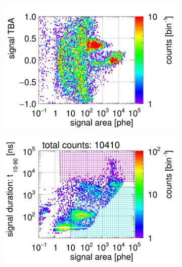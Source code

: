 \begin{landscape}
\begin{figure}[!p]
\begin{subfigure}[t]{0.32\textwidth}
			\includegraphics[width=\figurewidth,clip,trim={0 8 0 40}]{Figures/GasTest/CutsValid/res64765/tbapaX23Vecfig64765.jpg}
			\caption{}
			\label{fig:signal selection dv 08 02}
		\end{subfigure}
		\begin{subfigure}[t]{0.32\textwidth}
			\centering
			\includegraphics[width=\figurewidth,clip,trim={0 98 0 15}]{Figures/GasTest/CutsValid/res64765/pdpa26Vecfig64765.jpg}

\end{subfigure}
\end{figure}
\end{landscape}
